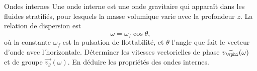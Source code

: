 \begin{exo}[PC][3][oral]{Ondes internes}
  Une onde interne est une onde gravitaire qui apparaît dans les fluides stratifiés, pour lesquels la masse volumique varie avec la profondeur $z$. La relation de dispersion est 
  $$
  \omega = \omega_{f} \cos \theta,
  $$
  où la constante $\omega_{f}$ est la pulsation de flottabilité, et $\theta$ l’angle que fait le vecteur d’onde avec l’horizontale. 
  Déterminer les vitesses vectorielles de phase  $\Vec{v_{\vphi}}(\omega)$ et de groupe $\Vec{v_g}(\omega)$. En déduire les propriétés des ondes internes.


\end{exo}
